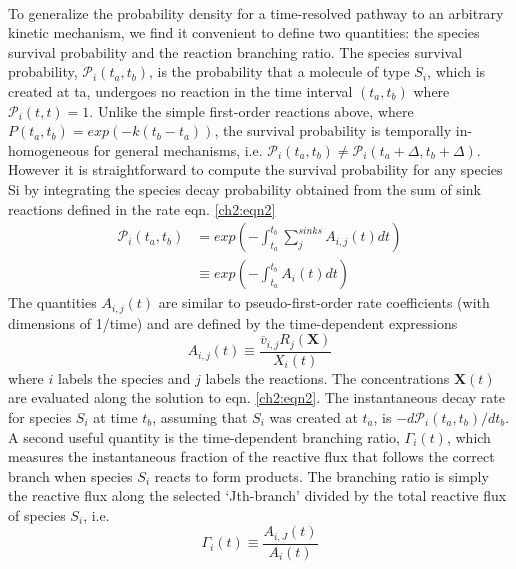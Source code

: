 \paragraph{}
To generalize the probability density for a time-resolved pathway to an arbitrary
kinetic mechanism, we find it convenient to define two quantities: the species survival
probability and the reaction branching ratio. The species survival probability, $\mathcal{P}_{i}(t_a,t_b)$,
is the probability that a molecule of type $S_i$, which is created at ta, undergoes no reaction
in the time interval $(t_a, t_b)$ where $\mathcal{P}_{i}(t,t)=1$. Unlike the simple first-order reactions
above, where $P(t_a, t_b) = exp(-k(t_b - t_a))$, the survival probability is temporally in-homogeneous
for general mechanisms, i.e. $\mathcal{P}_{i}(t_a,t_b) \neq \mathcal{P}_{i}(t_a+\Delta,t_b + \Delta) $. However it is
straightforward to compute the survival probability for any species Si by integrating the
species decay probability obtained from the sum of sink reactions defined in the rate
eqn. \ref{ch2:eqn2}
\begin{equation}
\label{ch2:eqn10}
\begin{split}
\mathcal{P}_{i}(t_a,t_b)&= exp\left( -\int_{t_a}^{t_b}{\sum_{j}^{sinks}{A_{i,j}(t)dt}} \right) \\
& \equiv exp\left( -\int_{t_a}^{t_b}{A_i(t)dt} \right)
\end{split}
\end{equation}
The quantities $A_{i,j}(t)$ are similar to pseudo-first-order rate coefficients (with dimensions
of 1/time) and are defined by the time-dependent expressions
\begin{equation}
\label{ch2:eqn11}
A_{i,j}(t) \equiv \frac{\overline{v}_{i,j}R_j(\textbf{X})}{X_i(t)}
\end{equation}
where $i$ labels the species and $j$ labels the reactions. The concentrations $\mathbf{X}(t)$ are evaluated
along the solution to eqn. \ref{ch2:eqn2}. The instantaneous decay rate for species $S_i$ at
time $t_b$, assuming that $S_i$ was created at $t_a$, is $-d\mathcal{P}_{i}(t_a,t_b) / d t_b$. A second useful quantity
is the time-dependent branching ratio, $\Gamma_{i}(t)$, which measures the instantaneous fraction
of the reactive flux that follows the correct branch when species $S_i$ reacts to form products.
The branching ratio is simply the reactive flux along the selected ‘Jth-branch’
divided by the total reactive flux of species $S_i$, i.e.
\begin{equation}
\label{ch2:eqn12}
\Gamma_i(t) \equiv \frac{A_{i,J}(t)}{A_i{(t)}}
\end{equation}
